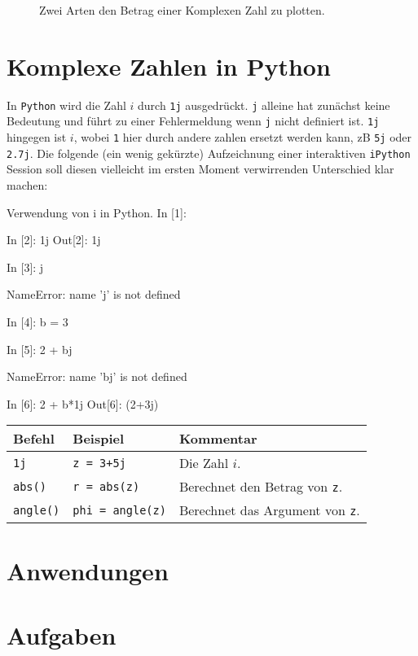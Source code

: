 \begin{figure}[h]
	\centering
	
	\caption{Zwei Arten den Betrag einer Komplexen Zahl zu plotten.}
	\label{fig:komp_3D}
\end{figure}


\section{Komplexe Zahlen in Python}

In \texttt{Python} wird die Zahl $i$ durch \texttt{1j} ausgedrückt. \texttt{j} alleine hat zunächst keine Bedeutung und führt zu einer Fehlermeldung wenn \texttt{j} nicht definiert ist. \texttt{1j} hingegen ist $i$, wobei \texttt{1} hier durch andere zahlen ersetzt werden kann, zB \texttt{5j} oder \texttt{2.7j}. Die folgende (ein wenig gekürzte) Aufzeichnung einer interaktiven \texttt{iPython} Session soll diesen vielleicht im ersten Moment verwirrenden Unterschied klar machen:

\begin{python}{Verwendung von i in Python.}
In [1]: %

In [2]: 1j
Out[2]: 1j

In [3]: j

NameError: name 'j' is not defined

In [4]: b = 3

In [5]: 2 + bj

NameError: name 'bj' is not defined

In [6]: 2 + b*1j
Out[6]: (2+3j)
\end{python}



\begin{table}[H]
    \centering
    \begin{tabular}{|p{3cm}|p{6cm}|p{6cm}|}
        \hline
    \textbf{Befehl} & \textbf{Beispiel} & \textbf{Kommentar} \\ \hline
    
    \texttt{1j} & \texttt{z = 3+5j} & Die Zahl $i$. \\ \hline
    \texttt{abs()} & \texttt{r = abs(z)} & Berechnet den Betrag von \texttt{z}. \\ \hline
    \texttt{angle()} & \texttt{phi = angle(z)} & Berechnet das Argument von \texttt{z}. \\ \hline


    \end{tabular}
\end{table}





\section{Anwendungen}\label{sec:anwendungen}

\section{Aufgaben}


